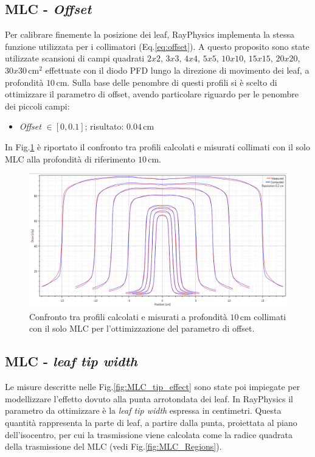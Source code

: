 \subsection{MLC - \textit{Offset}}
Per calibrare finemente la posizione dei leaf, RayPhysics implementa la stessa funzione utilizzata per i collimatori (Eq.\ref{eq:offset}). A questo proposito sono state utilizzate scansioni di campi quadrati $2x2$, $3x3$, $4x4$, $5x5$, $10x10$, $15x15$, $20x20$, $30x30\,$cm$^2$ effettuate con il diodo PFD lungo la direzione di movimento dei leaf, a profondità $10\,$cm. Sulla base delle penombre di questi profili si è scelto di ottimizzare il parametro di offset, avendo particolare riguardo per le penombre dei piccoli campi:
\begin{itemize}
\item \textit{Offset} $\in [0,0.1]$; risultato: $0.04\,$cm
\end{itemize}
In Fig.\ref{fig:MLC_Offset} è riportato il confronto tra profili calcolati e misurati collimati con il solo MLC alla profondità di riferimento $10\,$cm.
\begin{figure}
\centering
\includegraphics[width=\textwidth]{./cap2/MLC_Offset.png}
\caption{Confronto tra profili calcolati e misurati a profondità $10\,$cm collimati con il solo MLC per l'ottimizzazione del parametro di offset.}
\label{fig:MLC_Offset}
\end{figure}

\subsection{MLC - \textit{leaf tip width}}
Le misure descritte nelle Fig.\ref{fig:MLC_tip_effect} sono state poi impiegate per modellizzare l'effetto dovuto alla punta arrotondata dei leaf. In RayPhysics il parametro da ottimizzare è la \textit{leaf tip width} espressa in centimetri. Questa quantità rappresenta la parte di leaf, a partire dalla punta, proiettata al piano dell'isocentro, per cui la trasmissione viene calcolata come la radice quadrata della trasmissione del MLC (vedi Fig.\ref{fig:MLC_Regions}).

